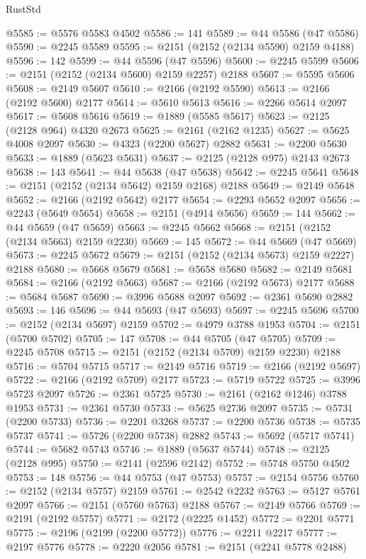\begin{lexlean}{RustStd}
\begin{coremodule}
@5585 := @5576 @5583 @4502
@5586 := 141
@5589 := @44 @5586 (@47 @5586)
@5590 := @2245 @5589
@5595 := @2151 (@2152 (@2134 @5590) @2159 @4188)
@5596 := 142
@5599 := @44 @5596 (@47 @5596)
@5600 := @2245 @5599
@5606 := @2151 (@2152 (@2134 @5600) @2159 @2257) @2188
@5607 := @5595 @5606
@5608 := @2149 @5607
@5610 := @2166 (@2192 @5590)
@5613 := @2166 (@2192 @5600) @2177
@5614 := @5610 @5613
@5616 := @2266 @5614 @2097
@5617 := @5608 @5616
@5619 := @1889 (@5585 @5617)
@5623 := @2125 (@2128 @964) @4320 @2673
@5625 := @2161 (@2162 @1235)
@5627 := @5625 @4008 @2097
@5630 := @4323 (@2200 @5627) @2882
@5631 := @2200 @5630
@5633 := @1889 (@5623 @5631)
@5637 := @2125 (@2128 @975) @2143 @2673
@5638 := 143
@5641 := @44 @5638 (@47 @5638)
@5642 := @2245 @5641
@5648 := @2151 (@2152 (@2134 @5642) @2159 @2168) @2188
@5649 := @2149 @5648
@5652 := @2166 (@2192 @5642) @2177
@5654 := @2293 @5652 @2097
@5656 := @2243 (@5649 @5654)
@5658 := @2151 (@4914 @5656)
@5659 := 144
@5662 := @44 @5659 (@47 @5659)
@5663 := @2245 @5662
@5668 := @2151 (@2152 (@2134 @5663) @2159 @2230)
@5669 := 145
@5672 := @44 @5669 (@47 @5669)
@5673 := @2245 @5672
@5679 := @2151 (@2152 (@2134 @5673) @2159 @2227) @2188
@5680 := @5668 @5679
@5681 := @5658 @5680
@5682 := @2149 @5681
@5684 := @2166 (@2192 @5663)
@5687 := @2166 (@2192 @5673) @2177
@5688 := @5684 @5687
@5690 := @3996 @5688 @2097
@5692 := @2361 @5690 @2882
@5693 := 146
@5696 := @44 @5693 (@47 @5693)
@5697 := @2245 @5696
@5700 := @2152 (@2134 @5697) @2159
@5702 := @4979 @3788 @1953
@5704 := @2151 (@5700 @5702)
@5705 := 147
@5708 := @44 @5705 (@47 @5705)
@5709 := @2245 @5708
@5715 := @2151 (@2152 (@2134 @5709) @2159 @2230) @2188
@5716 := @5704 @5715
@5717 := @2149 @5716
@5719 := @2166 (@2192 @5697)
@5722 := @2166 (@2192 @5709) @2177
@5723 := @5719 @5722
@5725 := @3996 @5723 @2097
@5726 := @2361 @5725
@5730 := @2161 (@2162 @1246) @3788 @1953
@5731 := @2361 @5730
@5733 := @5625 @2736 @2097
@5735 := @5731 (@2200 @5733)
@5736 := @2201 @3268
@5737 := @2200 @5736
@5738 := @5735 @5737
@5741 := @5726 (@2200 @5738) @2882
@5743 := @5692 (@5717 @5741)
@5744 := @5682 @5743
@5746 := @1889 (@5637 @5744)
@5748 := @2125 (@2128 @995)
@5750 := @2141 (@2596 @2142)
@5752 := @5748 @5750 @4502
@5753 := 148
@5756 := @44 @5753 (@47 @5753)
@5757 := @2154 @5756
@5760 := @2152 (@2134 @5757) @2159
@5761 := @2542 @2232
@5763 := @5127 @5761 @2097
@5766 := @2151 (@5760 @5763) @2188
@5767 := @2149 @5766
@5769 := @2191 (@2192 @5757)
@5771 := @2172 (@2225 @1452)
@5772 := @2201 @5771
@5775 := @2196 (@2199 (@2200 @5772))
@5776 := @2211 @2217
@5777 := @2197 @5776
@5778 := @2220 @2056
@5781 := @2151 (@2241 @5778 @2488)

\end{coremodule}
\end{lexlean}
